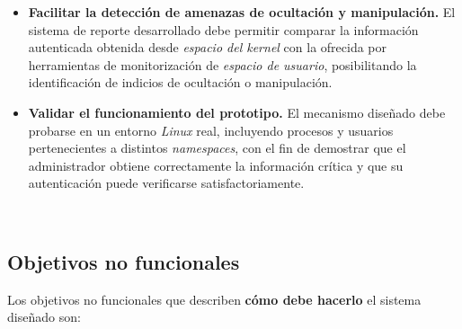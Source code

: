 \begin{itemize}
    \item \textbf{Facilitar la detección de amenazas de ocultación y manipulación.} El sistema de reporte desarrollado debe permitir comparar la información autenticada obtenida desde \textit{espacio del kernel} con la ofrecida por herramientas de monitorización de \textit{espacio de usuario}, posibilitando la identificación de indicios de ocultación o manipulación.
    \item \textbf{Validar el funcionamiento del prototipo.} El mecanismo diseñado debe probarse en un entorno \textit{Linux} real, incluyendo procesos y usuarios pertenecientes a distintos \textit{namespaces}, con el fin de demostrar que el administrador obtiene correctamente la información crítica y que su autenticación puede verificarse satisfactoriamente.
\end{itemize}

\

\subsection{Objetivos no funcionales}
\label{sec:onf}

Los objetivos no funcionales que describen \textbf{cómo debe hacerlo} el sistema diseñado son:


